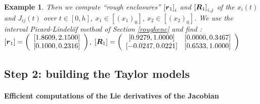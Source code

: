 \documentclass{sig-alternate-05-2015} %
\newcommand\ForAuthors[1]%
 {\par\smallskip                     %
  \begin{center}%
   \fbox%
   {\parbox{0.9\linewidth}%
    {\raggedright\sc--- #1}%
   }%
  \end{center}%
  \par\smallskip                     %
 }
\newtheorem{example}{Example}
\def\intvl#1{\mbox{$[ #1 ]$}}
\begin{document}
\begin{example}


Then we compute 
``rough enclosures''
$\intvl{\r_1}_i$ and $\intvl{\bfm{R}_1}_{i,j}$ of the $x_i(t)$ and $J_{ij}(t)$ over $t\in [0,h]$, 
$x_1 \in \intvl{(x_1)_0}$, $x_2 \in \intvl{(x_2)_0}$. 
We use the interval Picard-Lindel\"of method of Section \ref{roughenc} and find : 
$\intvl{\r_1} = \left(\begin{array}{c}
\left[ 1.8609,    2.1500 \right]\\ 
\left[ 0.1000,    0.2316 \right] 
\end{array}\right)$, 
$\intvl{\bfm{R}_1} =\left(\begin{array}{cc} 
\left[    0.9279,    1.0000\right] & \left[    0.0000,    0.3467\right] \\
\left[   -0.0247,    0.0221\right] & \left[    0.6533,    1.0000\right] 
\end{array}\right)$
\end{example}


\subsection{Step 2: building the Taylor models}

\paragraph{Efficient computations of the Lie derivatives of the Jacobian}
\end{document}
